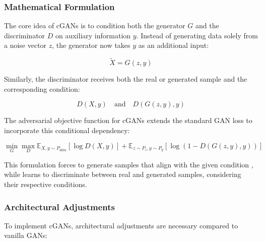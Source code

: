 \subsubsection{Mathematical Formulation}
\label{theoretical_cgan_math}
The core idea of cGANs is to condition both the generator \(G\) and the discriminator \(D\) on auxiliary information \(y\). Instead of generating data solely from a noise vector \(z\), the generator now takes \(y\) as an additional input:

\begin{equation}
\tilde{X} = G(z, y)
\end{equation}

\noindent
Similarly, the discriminator receives both the real or generated sample and the corresponding condition:

\begin{equation}
D(X, y) \quad \text{and} \quad D(G(z, y), y)
\end{equation}

\noindent
The adversarial objective function for cGANs extends the standard GAN loss to incorporate this conditional dependency:

\begin{equation}\label{theory_gan_cond_formula}
\min_G \max_D \mathbb{E}_{X, y \sim P_{data}} [\log D(X, y)] + \mathbb{E}_{z \sim P_z, y \sim P_y} [\log (1 - D(G(z, y), y))]
\end{equation}

\noindent
This formulation forces to generate samples that align with the given condition , while  learns to discriminate between real and generated samples, considering their respective conditions.

\subsubsection{Architectural Adjustments}
\label{theory_cgan_architecture}
To implement cGANs, architectural adjustments are necessary compared to vanilla GANs:


